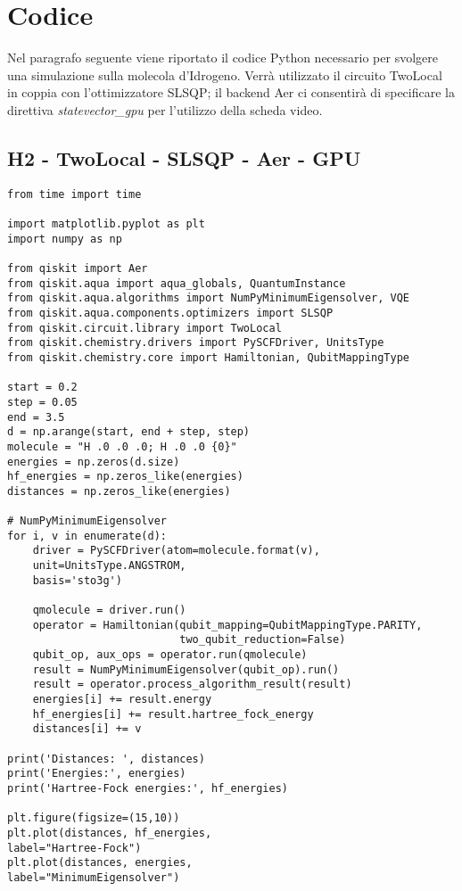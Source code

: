 \chapter{Codice}\label{codice:vqe}
Nel paragrafo seguente viene riportato il codice Python necessario per svolgere una simulazione sulla molecola d'Idrogeno.
Verrà utilizzato il circuito TwoLocal in coppia con l'ottimizzatore SLSQP; il backend Aer ci consentirà di specificare la direttiva \textit{statevector\_gpu} per l'utilizzo della scheda video.

\section{H2 - TwoLocal - SLSQP - Aer - GPU}
\begin{footnotesize}
\begin{verbatim}
from time import time

import matplotlib.pyplot as plt
import numpy as np

from qiskit import Aer
from qiskit.aqua import aqua_globals, QuantumInstance
from qiskit.aqua.algorithms import NumPyMinimumEigensolver, VQE
from qiskit.aqua.components.optimizers import SLSQP
from qiskit.circuit.library import TwoLocal
from qiskit.chemistry.drivers import PySCFDriver, UnitsType
from qiskit.chemistry.core import Hamiltonian, QubitMappingType

start = 0.2
step = 0.05
end = 3.5
d = np.arange(start, end + step, step)
molecule = "H .0 .0 .0; H .0 .0 {0}"
energies = np.zeros(d.size)
hf_energies = np.zeros_like(energies)
distances = np.zeros_like(energies)

# NumPyMinimumEigensolver
for i, v in enumerate(d):
    driver = PySCFDriver(atom=molecule.format(v),
    unit=UnitsType.ANGSTROM,
    basis='sto3g')
    
    qmolecule = driver.run()
    operator = Hamiltonian(qubit_mapping=QubitMappingType.PARITY,
                           two_qubit_reduction=False)
    qubit_op, aux_ops = operator.run(qmolecule)
    result = NumPyMinimumEigensolver(qubit_op).run()
    result = operator.process_algorithm_result(result)
    energies[i] += result.energy
    hf_energies[i] += result.hartree_fock_energy
    distances[i] += v
    
print('Distances: ', distances)
print('Energies:', energies)
print('Hartree-Fock energies:', hf_energies)

plt.figure(figsize=(15,10))
plt.plot(distances, hf_energies,
label="Hartree-Fock")
plt.plot(distances, energies,
label="MinimumEigensolver")


\end{verbatim}
\end{footnotesize}
